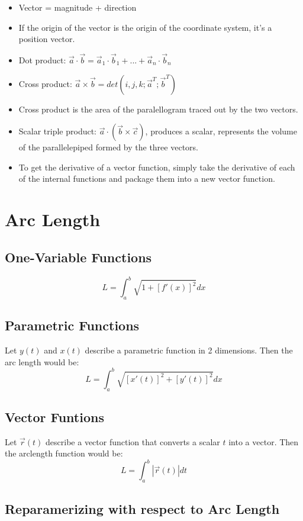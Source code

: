 \documentclass[a4paper,12pt]{report}
\begin{document}
\begin{itemize}
\item Vector = magnitude + direction
\item If the origin of the vector is the origin of the coordinate system, it's a position vector.
\item Dot product: 
$\vec{a} \cdot \vec{b} = \vec{a}_1 \cdot \vec{b}_1 + ... + \vec{a}_n \cdot \vec{b}_n$
\item Cross product: $\vec{a} \times \vec{b} = det(i, j, k; \vec{a}^{T}; \vec{b}^{T})$
\item Cross product is the area of the paralellogram traced out by the two vectors.
\item Scalar triple product: $\vec{a} \cdot (\vec{b} \times \vec{c})$, produces a scalar, represents the volume of the parallelepiped formed by the three vectors.
\item To get the derivative of a vector function, simply  take the derivative of each of the internal functions and package them into a new vector function.
\end{itemize}

\section{Arc Length}
\subsection{One-Variable Functions}
$$L = \int_a^b \sqrt{1+[f'(x)]^2} dx$$

\subsection{Parametric Functions}
Let $y(t)$ and $x(t)$ describe a parametric function in 2 dimensions. Then the arc length would be:
$$L = \int_a^b \sqrt{[x'(t)]^2 + [y'(t)]^2} dx$$

\subsection{Vector Funtions}
Let $\vec{r}(t)$ describe a vector function that converts a scalar $t$ into a vector. Then the arclength function would be:
$$L = \int_a^b |\vec{r}(t)| dt$$

\subsection{Reparamerizing with respect to Arc Length}
\end{document}
